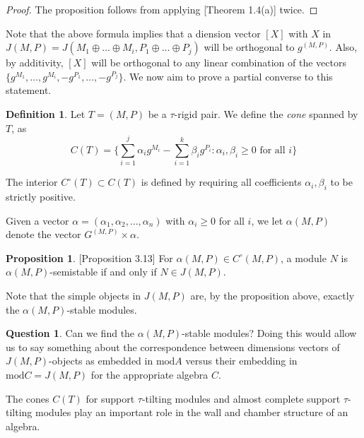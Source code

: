 \documentclass[]{article}
\theoremstyle{definition}
\newtheorem{definition}{Definition}[section]
\newtheorem{proposition}{Proposition}[section]
\newtheorem{question}{Question}
\newcommand{\tu}{\ensuremath{\tau}}
\begin{document}
\begin{proof}
	The proposition follows from applying \cite{auslander1985modules}[Theorem 1.4(a)] twice.
\end{proof}

Note that the above formula implies that a diension vector $[X]$ with $X$ in $J(M,P) = J(M_1\oplus\dots\oplus M_i,P_1\oplus\dots\oplus P_j)$ will be orthogonal to $g^{(M,P)}$. Also, by additivity, $[X]$ will be orthogonal to any linear combination of the vectors $\{g^{M_1},\dots,g^{M_i},-g^{P_1},\dots,-g^{P_j}\}$. We now aim to prove a partial converse to this statement.
\begin{definition}
	Let $T = (M,P)$ be a \tu-rigid pair. We define the \textit{cone} spanned by $T$, as \[C(T) = \{\sum_{i = 1}^{j} \alpha_ig^{M_i} - \sum_{i = 1}^{k}\beta_ig^{P_i} : \alpha_i,\beta_i \geq 0 \text{ for all } i\}\]
	
	The interior $C^\circ(T) \subset C(T)$ is defined by requiring all coefficients $\alpha_i,\beta_i$ to be strictly positive.
\end{definition} 

Given a vector $\alpha = (\alpha_1,\alpha_2,\dots,\alpha_n)$ with $\alpha_i \geq 0$ for all $i$, we let $\alpha(M,P)$ denote the vector $G^{(M,P)} \times \alpha$.

\begin{proposition}\cite{Br_stle_2019}[Proposition 3.13]
	For $\alpha(M,P) \in C^\circ(M,P)$, a module $N$ is $\alpha(M,P)$-semistable if and only if $N \in J(M,P)$.
\end{proposition}

Note that the simple objects in $J(M,P)$ are, by the proposition above, exactly the $\alpha(M,P)$-stable modules.

\begin{question}
	Can we find the $\alpha(M,P)$-stable modules? Doing this would allow us to say something about the correspondence between dimensions vectors of $J(M,P)$-objects as embedded in $\text{mod} A$ versus their embedding in $\text{mod} C = J(M,P)$ for the appropriate algebra $C$.
\end{question}



The cones $C(T)$ for support \tu-tilting modules and almost complete support \tu-tilting modules play an important role in the wall and chamber structure of an algebra.
\end{document}
